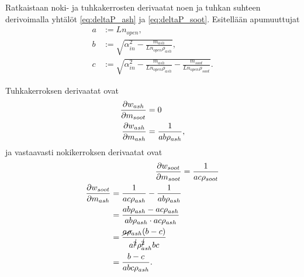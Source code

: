 Ratkaistaan noki- ja tuhkakerrosten derivaatat noen ja tuhkan suhteen derivoimalla yhtälöt \eqref{eq:deltaP_ash} ja \eqref{eq:deltaP_soot}.
Esitellään apumuuttujat
\begin{align*}
    a &:= L n_{open}, \\
    b &:= \sqrt{\alpha_{in}^2 - \frac{m_{ash}}{L n_{open} \rho_{ash}}}, \\
    c &:= \sqrt{\alpha_{in}^2 - \frac{m_{ash}}{L n_{open} \rho_{ash}} - \frac{m_{soot}}{L n_{open} \rho_{soot}}}.
\end{align*}

Tuhkakerroksen derivaatat ovat
\begin{align}
    \frac{\partial w_{ash}}{\partial m_{soot}} & =0\\
    \frac{\partial w_{ash}}{\partial m_{ash}} &= \frac{1}{ab\rho_{ash}},
\end{align}
ja vastaavasti nokikerroksen derivaatat ovat
\begin{align}
    \frac{\partial w_{soot}}{\partial m_{soot}} &= \frac{1}{ac\rho_{soot}}\\
    \begin{split}
    \frac{\partial w_{soot}}{\partial m_{ash}} &= \frac{1}{ac\rho_{ash}}-\frac{1}{ab\rho_{ash}}
    \\ &= \frac{ab \rho_{ash} - ac\rho_{ash}}{ab\rho_{ash}\cdot ac \rho_{ash}}
    \\ &= \frac{\cancel{a\rho}_{ash}(b-c)}{a^{\cancel{2}} \rho_{ash}^{\cancel{2}} bc}
    \\ &= \frac{b-c}{abc\rho_{ash}}.
    \end{split}
\end{align}








